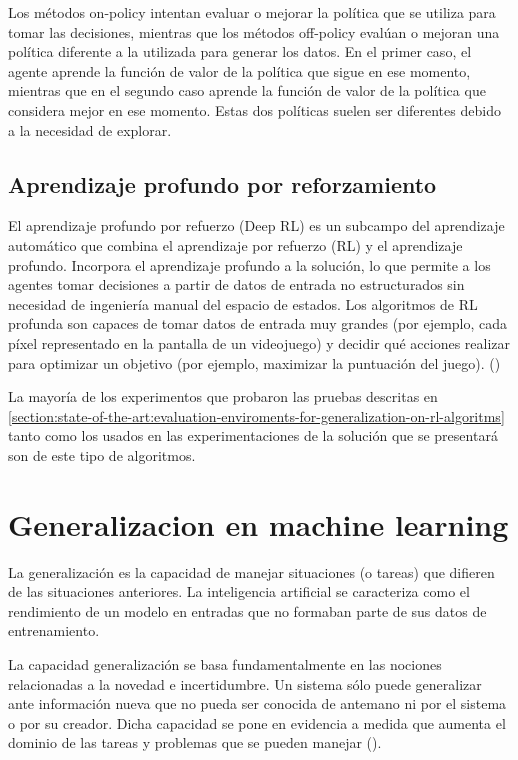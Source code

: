 Los métodos on-policy intentan evaluar o mejorar la política que se utiliza para tomar las decisiones, mientras que los métodos off-policy evalúan o mejoran una política diferente a la utilizada para generar los datos. En el primer caso, el agente aprende la función de valor de la política que sigue en ese momento, mientras que en el segundo caso aprende la función de valor de la política que considera mejor en ese momento. Estas dos políticas suelen ser diferentes debido a la necesidad de explorar.

\subsection{Aprendizaje profundo por reforzamiento}

El aprendizaje profundo por refuerzo (Deep RL) es un subcampo del aprendizaje automático que combina el aprendizaje por refuerzo (RL) y el aprendizaje profundo. Incorpora el aprendizaje profundo a la solución, lo que permite a los agentes tomar decisiones a partir de datos de entrada no estructurados sin necesidad de ingeniería manual del espacio de estados. Los algoritmos de RL profunda son capaces de tomar datos de entrada muy grandes (por ejemplo, cada píxel representado en la pantalla de un videojuego) y decidir qué acciones realizar para optimizar un objetivo (por ejemplo, maximizar la puntuación del juego). (\cite{franccois2018introduction})

La mayoría de los experimentos que probaron las pruebas descritas en \ref{section:state-of-the-art:evaluation-enviroments-for-generalization-on-rl-algoritms} tanto como los usados en las experimentaciones de la solución que se presentará son de este tipo de algoritmos.

\section{Generalizacion en machine learning}\label{section:state-of-the-art:generalization-on-machine-learning}

La generalización es la capacidad de manejar situaciones (o tareas) que difieren de las situaciones anteriores. La inteligencia artificial se caracteriza como el rendimiento de un modelo en entradas que no formaban parte de sus datos de entrenamiento.

La capacidad generalización se basa fundamentalmente en las nociones relacionadas a la novedad e incertidumbre. Un sistema sólo puede generalizar ante información nueva que no pueda ser conocida de antemano ni por el sistema o por su creador. Dicha capacidad se pone en evidencia a medida que aumenta el dominio de las tareas y problemas que se pueden manejar (\cite{chollet2019measure}).

